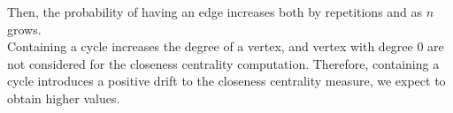 Then, the probability of having an edge increases both by repetitions and as $n$ grows.\\
Containing a cycle increases the degree of a vertex, and vertex with degree 0 are not considered for the closeness centrality computation. Therefore, containing a cycle introduces a positive drift to the closeness centrality measure, we expect to obtain higher values.